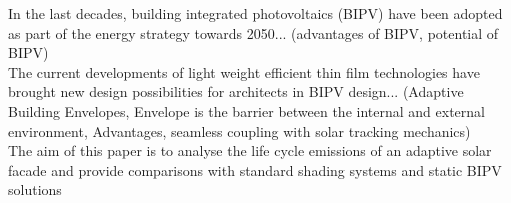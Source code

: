 
In the last decades, building integrated photovoltaics (BIPV) have been adopted as part of the energy strategy towards 2050... (advantages of BIPV, potential of BIPV)\\

The current developments of light weight efficient thin film technologies have brought new design possibilities for architects in BIPV design... (Adaptive Building Envelopes, Envelope is the barrier between the internal and external environment, Advantages, seamless coupling with solar tracking mechanics) \\

The aim of this paper is to analyse the life cycle emissions of an adaptive solar facade and provide comparisons with standard shading systems and static BIPV solutions